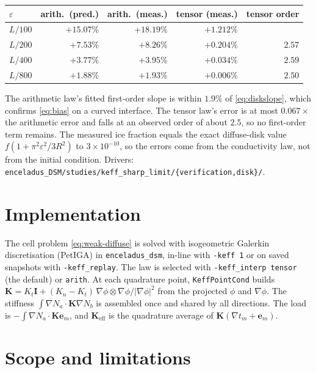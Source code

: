 \documentclass[11pt]{article}
\newcommand{\bI}{\mathbf I}
\newcommand{\be}{\mathbf e}
\newcommand{\bK}{\mathbf K}
\newcommand{\Keff}{\mathbf{K}_{\mathrm{eff}}}
\newcommand{\Kt}{K_{t}}
\newcommand{\Kn}{K_{n}}
\begin{document}
\begin{center}
\begin{tabular}{@{}lrrrr@{}}
\toprule
$\varepsilon$ & arith.\ (pred.) & arith.\ (meas.) & tensor (meas.) & tensor order\\
\midrule
$L/100$ & $+15.07\%$ & $+18.19\%$ & $+1.212\%$ & \\
$L/200$ & $+7.53\%$  & $+8.26\%$  & $+0.204\%$ & $2.57$\\
$L/400$ & $+3.77\%$  & $+3.95\%$  & $+0.034\%$ & $2.59$\\
$L/800$ & $+1.88\%$  & $+1.93\%$  & $+0.006\%$ & $2.50$\\
\bottomrule
\end{tabular}
\end{center}

\noindent The arithmetic law's fitted first-order slope is within $1.9\%$ of
\eqref{eq:diskslope}, which confirms \eqref{eq:bias} on a curved interface. The
tensor law's error is at most $0.067\times$ the arithmetic error and falls at an
observed order of about $2.5$, so no first-order term remains. The measured ice
fraction equals the exact diffuse-disk value $f(1+\pi^2\varepsilon^2/3R^2)$ to
$3\times10^{-10}$, so the errors come from the conductivity law, not from the
initial condition. Drivers:
\verb|enceladus_DSM/studies/keff_sharp_limit/{verification,disk}/|.

\section{Implementation}
\label{sec:code}

The cell problem \eqref{eq:weak-diffuse} is solved with isogeometric Galerkin
discretisation (PetIGA) in \verb|enceladus_dsm|, in-line with \verb|-keff 1|
or on saved snapshots with \verb|-keff_replay|. The law is selected with
\verb|-keff_interp tensor| (the default) or \verb|arith|. At each quadrature
point, \verb|KeffPointCond| builds
$\bK=\Kt\bI+(\Kn-\Kt)\,\nabla\phi\otimes\nabla\phi/|\nabla\phi|^2$
from the projected $\phi$ and $\nabla\phi$. The stiffness
$\int\nabla N_a\cdot\bK\nabla N_b$ is assembled once and shared by all
directions. The load is $-\int\nabla N_a\cdot\bK\be_m$, and $\Keff$ is the
quadrature average of $\bK(\nabla t_m+\be_m)$.

\section{Scope and limitations}
\label{sec:scope}
\end{document}
